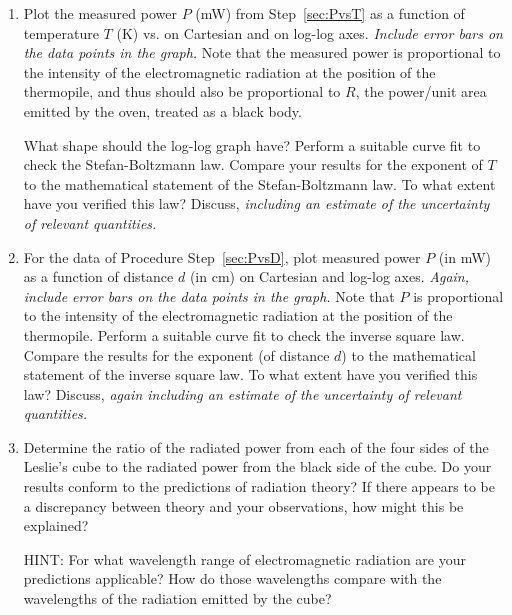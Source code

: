 \begin {enumerate}


\item Plot the measured power $P$ (mW) from Step~\ref{sec:PvsT} as a function of
temperature $T$ (K) vs. on Cartesian and on log-log axes. {\em Include error bars on the data points in the graph.} Note that the measured power is proportional to the intensity of the electromagnetic radiation at the position of the thermopile, and thus should also be proportional to $R$, the power/unit area emitted by the oven, treated as a black body. 

What shape should the log-log graph have?  Perform a suitable curve fit
to check the Stefan-Boltzmann law.  Compare your results for the
exponent of $T$ to the mathematical statement of the Stefan-Boltzmann
law.  To what extent have you verified this law?  Discuss, {\em including an estimate of the uncertainty of relevant quantities.}


\item For the data of Procedure Step~\ref{sec:PvsD}, plot measured power $P$ (in mW) as
a function of distance $d$ (in cm) on Cartesian and log-log axes.  {\em Again, include error bars on the data points in the graph.}  Note
that $P$ is proportional to the intensity of the electromagnetic
radiation at the position of the thermopile.  Perform a suitable curve
fit to check the inverse square law.  Compare the results for the
exponent (of distance $d$) to the mathematical statement of the inverse
square law. To what extent have you verified this law?  Discuss, {\em again including an estimate of the uncertainty of relevant quantities.}



\item Determine the ratio of the radiated power from each of the four
sides of the Leslie's cube to the radiated power from
the black side of the cube.  Do your results conform to the
predictions of radiation theory?  If there appears to be a discrepancy
between theory and your observations, how might this be explained? 

HINT: For what wavelength range of electromagnetic radiation are your
predictions applicable?  How do those wavelengths compare with the
wavelengths of the radiation emitted by the cube? 

\end{enumerate}


